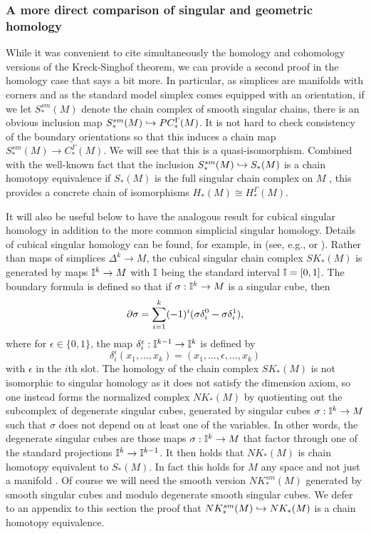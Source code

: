 \subsubsection{A more direct comparison of singular and geometric homology}

While it was convenient to cite simultaneously the homology and cohomology versions of the Kreck-Singhof theorem, we can provide a second proof in the homology case that says a bit more. In particular, as simplices are manifolds with corners and as the standard model simplex comes equipped with an orientation, if we let $S^{sm}_*(M)$ denote the chain complex of smooth singular chains,  there is an obvious inclusion map $S^{sm}_*(M)\hookrightarrow PC_*^\Gamma(M)$. It is not hard to check consistency of the boundary orientations so that this induces a chain map $S^{sm}_*(M)\to C_*^\Gamma(M)$. We will see that this is a quasi-isomorphism. Combined with the well-known fact that the inclusion $S^{sm}_*(M)\hookrightarrow S_*(M)$ is a chain homotopy equivalence if $S_*(M)$ is the full singular chain complex on $M$ \cite[Theorem 18.7]{Lee13}, this provides a concrete chain of isomorphisms $H_*(M)\cong H_*^\Gamma(M)$.

It will also be useful below to have the analogous result for cubical singular homology in addition to the more common simplicial singular homology. Details of cubical singular homology can be found, for example, in (see, e.g., \cite{Mas91} or \cite[Section 8.3]{HW60}). Rather than maps of simplices $\Delta^k\to M$, the cubical singular chain complex $SK_*(M)$ is generated by maps $\mathbb{I}^k\to M$ with $\mathbb{I}$ being the standard interval $\mathbb{I}=[0,1]$. The boundary formula is defined so that if $\sigma: \mathbb{I}^k\to M$ is a singular cube, then
\begin{equation}\label{E: cube bd}
\partial \sigma=\sum_{i=1}^k (-1)^i(\sigma \delta_i^0-\sigma \delta^1_i),
\end{equation}
where for $\epsilon\in\{0,1\}$, the map $\delta_i^\epsilon:\mathbb{I}^{k-1}\to \mathbb{I}^k$ is defined by
$$\delta_i^\epsilon(x_1,\ldots,x_k)=(x_1,\ldots,\epsilon,\ldots, x_k)$$
with $\epsilon$ in the $i$th slot. The homology of the chain complex $SK_*(M)$ is not isomorphic to singular homology as it does not satisfy the dimension axiom, so one instead forms the normalized complex $NK_*(M)$ by quotienting out the subcomplex of degenerate singular cubes, generated by singular cubes $\sigma:\mathbb{I}^k\to M$ such that $\sigma$ does not depend on at least one of the variables. In other words, the degenerate singular cubes are those maps $\sigma:\mathbb{I}^k\to M$ that factor through one of the standard projections $\mathbb{I}^k\to \mathbb{I}^{k-1}$. It then holds that $NK_*(M)$ is chain homotopy equivalent to $S_*(M)$. In fact this holds for $M$ any space and not just a manifold \cite[Theorem 8.4.7]{HW60}. Of course we will need the smooth version $NK^{sm}_*(M)$ generated by smooth singular cubes and modulo degenerate smooth singular cubes. We defer to an appendix to this section the proof that $NK^{sm}_*(M)\hookrightarrow NK_*(M)$ is a chain homotopy equivalence.




